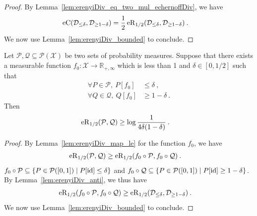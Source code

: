 \begin{proof}\leanok
By Lemma~\ref{lem:erenyiDiv_eq_two_mul_echernoffDiv}, we have
\begin{align*}
  \operatorname{eC}(\mathcal{D}_{\le \delta}, \mathcal{D}_{\ge 1 - \delta})
  &= \frac{1}{2} \operatorname{eR}_{1/2}(\mathcal{D}_{\le \delta}, \mathcal{D}_{\ge 1 - \delta})
  \: .
\end{align*}
We now use Lemma~\ref{lem:erenyiDiv_bounded} to conclude.
\end{proof}


\begin{theorem}\label{thm:erenyiDiv_lower_bound}
  \leanok
Let $\mathcal{P},\mathcal{Q} \subseteq \mathcal{P}(\mathcal{X})$ be two sets of probability measures.
Suppose that there exists a measurable function $f_0 : \mathcal{X} \to \mathbb{R}_{+,\infty}$ which is less than 1 and $\delta \in [0,1/2]$ such that
\begin{align*}
  \forall P \in \mathcal{P}, \: P[f_0] &\le \delta
  \: , \\
  \forall Q \in \mathcal{Q}, \: Q[f_0] &\ge 1 - \delta
  \: .
\end{align*}
Then
\begin{align*}
  \operatorname{eR}_{1/2}(\mathcal{P}, \mathcal{Q})
  &\ge \log \frac{1}{4\delta(1 - \delta)}
  \: .
\end{align*}
\end{theorem}

\begin{proof}\leanok
By Lemma~\ref{lem:erenyiDiv_map_le} for the function $f_0$, we have
\begin{align*}
  \operatorname{eR}_{1/2}(\mathcal{P}, \mathcal{Q})
  &\ge \operatorname{eR}_{1/2}(f_0 \circ \mathcal{P}, f_0 \circ \mathcal{Q})
  \: .
\end{align*}
$f_0 \circ \mathcal{P} \subseteq \{P \in \mathcal{P}([0,1]) \mid P[\operatorname{id}] \le \delta\}$ and $f_0 \circ \mathcal{Q} \subseteq \{P \in \mathcal{P}([0,1]) \mid P[\operatorname{id}] \ge 1 - \delta\}$.
By Lemma~\ref{lem:erenyiDiv_anti}, we thus have
\begin{align*}
  \operatorname{eR}_{1/2}(f_0 \circ \mathcal{P}, f_0 \circ \mathcal{Q})
  &\ge \operatorname{eR}_{1/2}(\mathcal{D}_{\le \delta}, \mathcal{D}_{\ge 1 - \delta})
  \: .
\end{align*}
We now use Lemma~\ref{lem:erenyiDiv_bounded} to conclude.
\end{proof}


